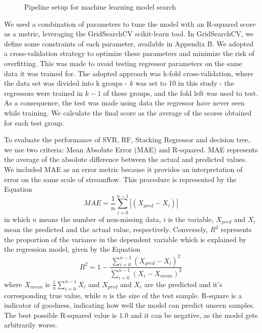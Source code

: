 \documentclass[12pt]{article}
\begin{document}
\begin{figure}[htbp]
    \centering
    {\small}
    \caption{Pipeline setup for machine learning model search}
    \label{fig:pipelines}
  \end{figure}

We used a combination of parameters to tune the model with an R-squared score as a metric, leveraging the GridSearchCV scikit-learn tool. In GridSearchCV, we define some constraints of each parameter, available in Appendix B. We adopted a cross-validation strategy to optimize these parameters and minimize the risk of overfitting. This was made to avoid testing regressor parameters on the same data it was trained for. The adopted approach was k-fold cross-validation, where the data set was divided into k groups - $k$ was set to 10 in this study - the regressors were trained in $k-1$ of these groups, and the fold left was used to test. As a consequence, the test was made using data the regressor have never seen while training. We calculate the final score as the average of the scores obtained for each test group.

To evaluate the performance of SVR, RF, Stacking Regressor and decision tree, we use two criteria: Mean Absolute Error (MAE) and R-squared. MAE represents the average of the absolute difference between the actual and predicted values. We included MAE as an error metric because it provides an interpretation of error on the same scale of streamflow. This procedure is represented by the Equation
    \begin{equation}
        \label{eqn:mae}
        MAE={\frac{1}{n}\sum_{i=0}^{n-1}|(X_{pred}-X_{i})|}
    \end{equation}
in which $n$ means the number of non-missing data, $i$ is the variable, $X_{pred}$ and $X_{i}$ mean the predicted and the actual value, respectively. Conversely, $R^2$ represents the proportion of the variance in the dependent variable which is explained by the regression model, given by the Equation
    \begin{equation}
        \label{eqn:r2}
        R^2={1 - \frac{\sum\limits_{i=0}^{n-1}(X_{pred}-X_{i})^{2}}
                      {\sum\limits_{i=0}^{n-1}(X_{i}-X_{mean})^{2}}}
    \end{equation}
where $X_{mean}$ is $\frac{1}{n}\sum_{i=0}^{n-1}X_{i}$ and $X_{pred}$ and $X_{i}$ are the predicted and it's corresponding true value, while $n$ is the size of the test sample. R-square is a indicator of goodness, indicating how well the model can predict unseen samples. The best possible R-squared value is $1.0$ and it can be negative, as the model gets arbitrarily worse.
\end{document}
